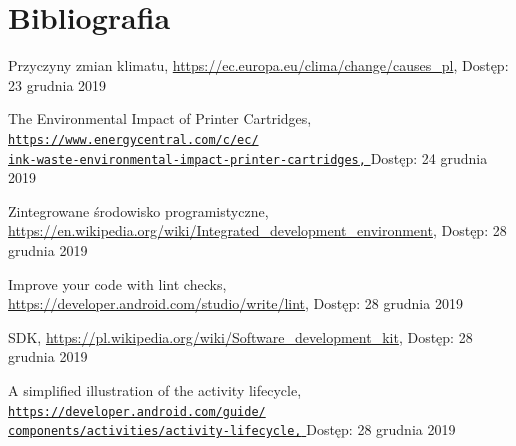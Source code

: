 \documentclass[a4paper,12pt, twoside]{article}
\begin{document}
       
        
    	\newpage
    	\section{Bibliografia}
    	
     	\begingroup
    	\renewcommand{\section}[2]{}
    	\begin{thebibliography}{}
    		
    		Przyczyny zmian klimatu,
    		\newline\url{https://ec.europa.eu/clima/change/causes\_pl}, 
    		\newline Dostęp: 23 grudnia 2019
    		
    		The Environmental Impact of Printer Cartridges,
    		\newline\href{https://www.energycentral.com/c/ec/ink-waste-environmental-impact-printer-cartridges}
    		 {\nolinkurl{https://www.energycentral.com/c/ec/}
                 \\
                  \nolinkurl{ink-waste-environmental-impact-printer-cartridges,}
                 }
    		\newline Dostęp: 24 grudnia 2019
    		
    		Zintegrowane środowisko programistyczne,
    		\newline\url{https://en.wikipedia.org/wiki/Integrated_development_environment}, 
    		\newline Dostęp: 28 grudnia 2019
    		
    		Improve your code with lint checks,
    		\newline\url{https://developer.android.com/studio/write/lint}, 
    		\newline Dostęp: 28 grudnia 2019
    		
    		SDK,
    		\newline\url{https://pl.wikipedia.org/wiki/Software_development_kit}, 
    		\newline Dostęp: 28 grudnia 2019
    		
    		A simplified illustration of the activity lifecycle,
    		\newline\href{https://developer.android.com/guide/components/activities/activity-lifecycle}
    		 {\nolinkurl{https://developer.android.com/guide/}
                 \\
                  \nolinkurl{components/activities/activity-lifecycle,}
                 }
    		\newline Dostęp: 28 grudnia 2019
    

\end{thebibliography}
\end{document}
